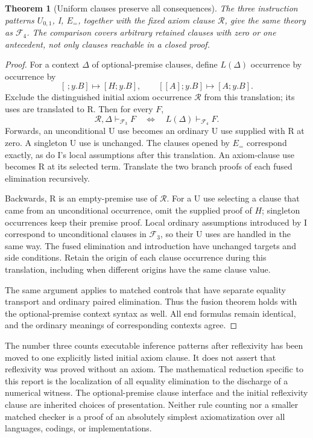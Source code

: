 \documentclass[11pt,letterpaper]{article}
\newtheorem{theorem}{Theorem}[section]
\theoremstyle{definition}\newtheorem{definition}[theorem]{Definition}
\theoremstyle{remark}\newtheorem{remark}[theorem]{Remark}
\begin{document}
\begin{theorem}[Uniform clauses preserve all consequences]
\label{fus:uniform-equivalence}
The three instruction patterns $U_{0,1}$, I, $E_{=}$, together with the fixed
axiom clause $\mathcal R$, give the same theory as $\mathcal F_4$. The
comparison covers arbitrary retained clauses with zero or one antecedent,
not only clauses reachable in a closed proof.
\end{theorem}
\begin{proof}
For a context $\Delta$ of optional-premise clauses, define $L(\Delta)$
occurrence by occurrence by
\[
 [\,;y.B]\longmapsto[H;y.B],\qquad
 [[A];y.B]\longmapsto[A;y.B].
\]
Exclude the distinguished initial axiom occurrence $\mathcal R$ from this
translation; its uses are translated to R. Then for every $F$,
\[
 \mathcal R,\Delta\vdash_{\mathcal F_3}F
 \quad\Longleftrightarrow\quad
 L(\Delta)\vdash_{\mathcal F_4}F.
\]
Forwards, an unconditional U use becomes an ordinary U use supplied with
R at zero. A singleton U use is unchanged. The clauses opened by $E_{=}$
correspond exactly, as do I's local assumptions after this translation.
An axiom-clause use becomes R at its selected term. Translate the two
branch proofs of each fused elimination recursively.

Backwards, R is an empty-premise use of $\mathcal R$. For a U use selecting
a clause that came from an unconditional occurrence, omit the supplied
proof of $H$; singleton occurrences keep their premise proof. Local
ordinary assumptions introduced by I correspond to unconditional clauses
in $\mathcal F_3$, so their U uses are handled in the same way.
The fused elimination and introduction have unchanged targets and
side conditions. Retain the origin of each clause occurrence during this
translation, including when different origins have the same clause value.

The same argument applies to matched controls that have separate equality
transport and ordinary paired elimination. Thus the fusion theorem holds
with the optional-premise context syntax as well. All end formulas remain
identical, and the ordinary meanings of corresponding contexts agree.
\end{proof}

The number three counts executable inference patterns after reflexivity
has been moved to one explicitly listed initial axiom clause. It does not
assert that reflexivity was proved without an axiom. The mathematical
reduction specific to this report is the localization of all equality
elimination to the discharge of a numerical witness. The optional-premise
clause interface and the initial reflexivity clause are inherited choices
of presentation. Neither rule counting nor a smaller matched checker is
a proof of an absolutely simplest axiomatization over all languages,
codings, or implementations.
\end{document}
